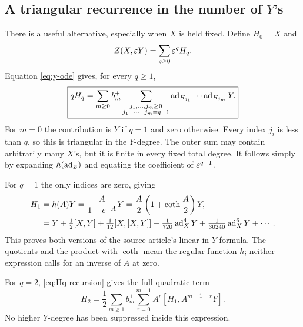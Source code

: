 \subsection{A triangular recurrence in the number of \texorpdfstring{$Y$}{Y}'s}
There is a useful alternative, especially when $X$ is held fixed. Define $H_0=X$ and
\[
 Z(X,\varepsilon Y)=\sum_{q\geq0}\varepsilon^qH_q.
\]
Equation \cref{eq:y-ode} gives, for every $q\geq1$,
\begin{equation}\label{eq:Hq-recursion}
 \boxed{\displaystyle
 qH_q=\sum_{m\geq0}b_m^+
 \sum_{\substack{j_1,\ldots,j_m\geq0\\j_1+\cdots+j_m=q-1}}
 \operatorname{ad}_{H_{j_1}}\cdots\operatorname{ad}_{H_{j_m}}Y.}
\end{equation}
For $m=0$ the contribution is $Y$ if $q=1$ and zero otherwise. Every index $j_i$ is less than $q$, so this is triangular in the $Y$-degree. The outer sum may contain arbitrarily many $X$'s, but it is finite in every fixed total degree. It follows simply by expanding $h(\operatorname{ad}_Z)$ and equating the coefficient of $\varepsilon^{q-1}$.

For $q=1$ the only indices are zero, giving
\begin{align}
 H_1&=h(A)Y=\frac{A}{1-e^{-A}}Y
 =\frac A2\left(1+\coth\frac A2\right)Y,\label{eq:H1}\\
 &=Y+\tfrac12[X,Y]+\tfrac1{12}[X,[X,Y]]
 -\tfrac1{720}\operatorname{ad}_X^4Y+\tfrac1{30240}\operatorname{ad}_X^6Y+\cdots .\nonumber
\end{align}
This proves both versions of the source article's linear-in-$Y$ formula. The quotients and the product with $\coth$ mean the regular function $h$; neither expression calls for an inverse of $A$ at zero.

For $q=2$, \cref{eq:Hq-recursion} gives the full quadratic term
\begin{equation}\label{eq:H2-frechet}
 H_2=\frac12\sum_{m\geq1}b_m^+
        \sum_{r=0}^{m-1}A^r[H_1,A^{m-1-r}Y].
\end{equation}
No higher $Y$-degree has been suppressed inside this expression.

